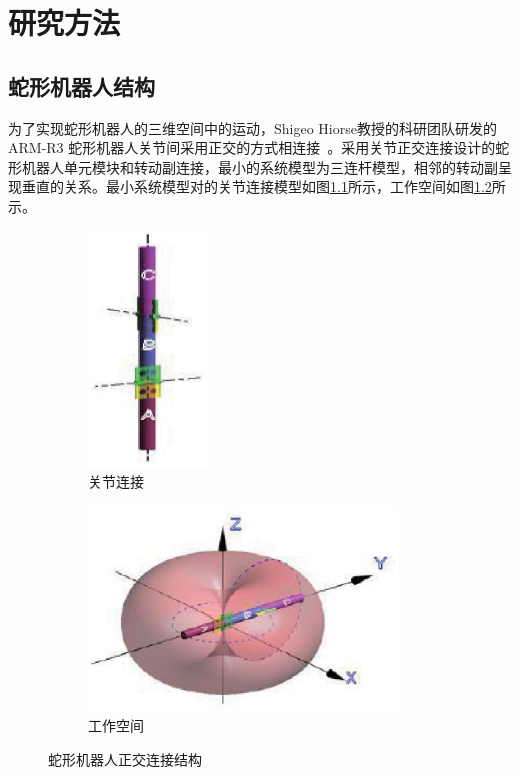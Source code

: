 \chapter{研究方法}
\label{cha:method}

\section{蛇形机器人结构}
为了实现蛇形机器人的三维空间中的运动，Shigeo Hiorse教授的科研团队研发的ARM-R3 蛇形机器人关节间采用正交的方式相连接~\cite{Prautsch1999Control}。采用关节正交连接设计的蛇形机器人单元模块和转动副连接，最小的系统模型为三连杆模型，相邻的转动副呈现垂直的关系。最小系统模型对的关节连接模型如图\ref{fig:connect}所示，工作空间如图\ref{fig:space}所示。
\begin{figure}[h!] %
	\begin{subfigure}{0.5\textwidth}
		\centering
		\includegraphics[width=0.35\textwidth,height=0.15\textheight]{figure/chap03/struct.eps}
		\caption{关节连接}
		\label{fig:connect}
	\end{subfigure}
	\begin{subfigure}{0.5\textwidth}
		\centering
		\includegraphics[width=0.9\textwidth,height=0.15\textheight]{figure/chap03/space.eps}
		\caption{工作空间}
		\label{fig:space}
	\end{subfigure}
	\caption{蛇形机器人正交连接结构}
	\label{fig:Orthogonal}
\end{figure}
